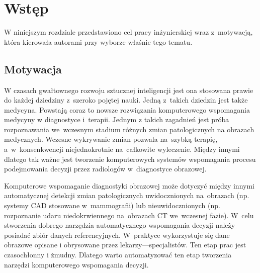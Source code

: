 \documentclass[a4paper,11pt,twoside,openright]{report}
\theoremstyle{definition}
\begin{document}
\thispagestyle{empty}
\newpage

\null\thispagestyle{empty}\newpage


\tableofcontents
\thispagestyle{empty}


\null\thispagestyle{empty}\newpage
\pagestyle{fancy}
\setcounter{page}{11} %

\chapter*{Wstęp}

W niniejszym rozdziale przedstawiono cel pracy inżynierskiej wraz z~motywacją,
która kierowała autorami przy wyborze właśnie tego tematu.

\section*{Motywacja}

W czasach gwałtownego rozwoju sztucznej inteligencji jest ona stosowana prawie
do każdej dziedziny z~szeroko pojętej nauki. Jedną z~takich dziedzin jest także medycyna.
Powstają coraz to nowsze rozwiązania komputerowego wspomagania medycyny w diagnostyce i~terapii.
Jednym z takich zagadnień jest próba rozpoznawania we~wczesnym stadium różnych zmian
patologicznych na obrazach medycznych. Wczesne wykrywanie zmian pozwala
na~szybką terapię, a~w~konsenkwencji niejednokrotnie na~całkowite wyleczenie. Między innymi dlatego
tak ważne jest tworzenie komputerowych systemów wspomagania procesu podejmowania
decyzji przez radiologów w~diagnostyce obrazowej.

Komputerowe wspomaganie diagnostyki obrazowej może dotyczyć między innymi automatycznej
detekcji zmian patologicznych uwidocznionych na~obrazach (np. systemy CAD stosowane
w~mammografii) lub nieuwidocznionych (np. rozpoznanie udaru niedokrwiennego na~obrazach %
CT we~wczesnej fazie). W~celu stworzenia dobrego narzędzia automatycznego wspomagania %
decyzji należy posiadać zbiór danych referencyjnych. W~praktyce wykorzystuje się
dane obrazowe opisane i obrysowane przez lekarzy---specjalistów. Ten etap prac
jest czasochłonny i żmudny. Dlatego warto automatyzować ten etap tworzenia narzędzi
komputerowego wspomagania decyzji.
\end{document}
